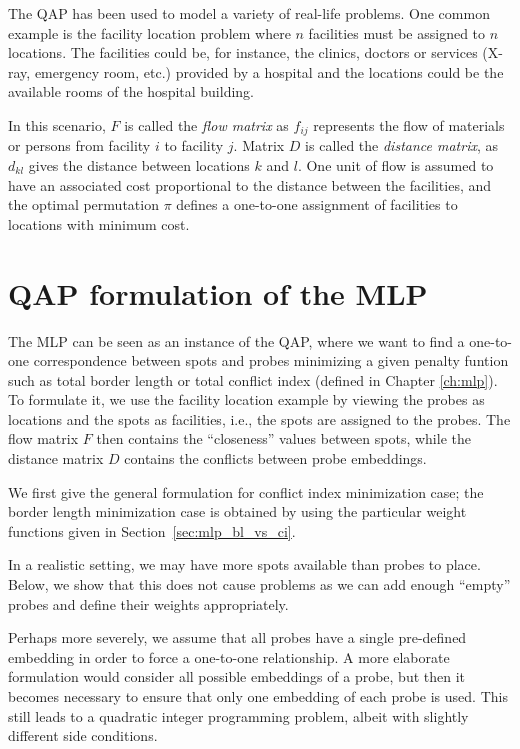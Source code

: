 The QAP has been used to model a variety of real-life problems. One common
example is the facility location problem where $n$ facilities must be assigned
to $n$ locations. The facilities could be, for instance, the clinics, doctors or
services (X-ray, emergency room, etc.) provided by a hospital and the locations
could be the available rooms of the hospital building.

In this scenario, $F$ is called the \emph{flow matrix} as $f_{ij}$ represents
the flow of materials or persons from facility $i$ to facility $j$. Matrix $D$
is called the \emph{distance matrix}, as $d_{kl}$ gives the distance between
locations $k$ and $l$. One unit of flow is assumed to have an associated cost
proportional to the distance between the facilities, and the optimal permutation
$\pi$ defines a one-to-one assignment of facilities to locations with minimum
cost.

\section{QAP formulation of the MLP}
\label{sec:qap_mlp}

The MLP can be seen as an instance of the QAP, where we want to find a
one-to-one correspondence between spots and probes minimizing a given penalty
funtion such as total border length or total conflict index (defined in Chapter
\ref{ch:mlp}). To formulate it, we use the facility location example by viewing
the probes as locations and the spots as facilities, i.e., the spots are
assigned to the probes. The flow matrix $F$ then contains the ``closeness''
values between spots, while the distance matrix $D$ contains the conflicts
between probe embeddings.

We first give the general formulation for conflict index minimization case; the
border length minimization case is obtained by using the particular weight
functions given in Section~\ref{sec:mlp_bl_vs_ci}.

In a realistic setting, we may have more spots available than probes to place.
Below, we show that this does not cause problems as we can add enough ``empty''
probes and define their weights appropriately.

Perhaps more severely, we assume that all probes have a single pre-defined
embedding in order to force a one-to-one relationship.  A more elaborate
formulation would consider all possible embeddings of a probe, but then it
becomes necessary to ensure that only one embedding of each probe is used. This
still leads to a quadratic integer programming problem, albeit with slightly
different side conditions.

